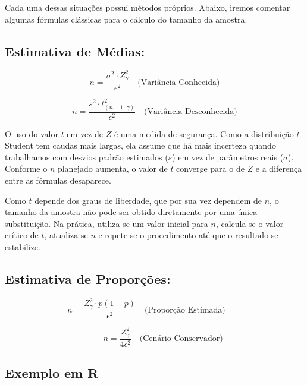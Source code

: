 Cada uma dessas situações possui métodos próprios. Abaixo, iremos comentar algumas fórmulas clássicas para o cálculo do tamanho da amostra.

\subsection{Estimativa de Médias:}
\begin{equation}
  n = \frac{\sigma^2 \cdot Z_{\gamma}^2}{\epsilon^2} \quad \text{(Variância Conhecida)} 
\end{equation}

\begin{equation}
  n = \frac{s^2 \cdot t_{(n-1,\, \gamma)}^2}{\epsilon^2} \quad \text{(Variância Desconhecida)}
\end{equation}

\begin{deepdive}
O uso do valor $t$ em vez de $Z$ é uma medida de segurança. Como a distribuição $t$-Student tem caudas mais largas, ela assume que há mais incerteza quando trabalhamos com desvios padrão estimados ($s$) em vez de parâmetros reais ($\sigma$). Conforme o $n$ planejado aumenta, o valor de $t$ converge para o de $Z$ e a diferença entre as fórmulas desaparece.

Como $t$ depende dos graus de liberdade, que por sua vez dependem de $n$, o tamanho da amostra não pode ser obtido diretamente por uma única substituição. Na prática, utiliza-se um valor inicial para $n$, calcula-se o valor crítico de $t$, atualiza-se $n$ e repete-se o procedimento até que o resultado se estabilize.
\end{deepdive}

\subsection{Estimativa de Proporções:}
\begin{equation}
  n = \frac{Z_{\gamma}^2 \cdot p(1-p)}{\epsilon^2} \quad \text{(Proporção Estimada)} \qquad
\end{equation}

\begin{equation}
\qquad n = \frac{Z_{\gamma}^2}{4\epsilon^2} \quad \text{(Cenário Conservador)}
\end{equation}

\subsection{Exemplo em R}

